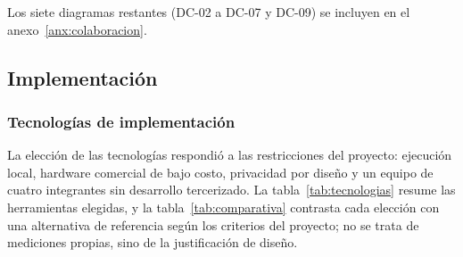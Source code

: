 

Los siete diagramas restantes (DC-02 a DC-07 y DC-09) se incluyen en el anexo~\ref{anx:colaboracion}.

\subsection{Implementación}

\subsubsection{Tecnologías de implementación}\label{sec:tecnologias}

La elección de las tecnologías respondió a las restricciones del proyecto: ejecución local, hardware comercial de bajo costo, privacidad por diseño y un equipo de cuatro integrantes sin desarrollo tercerizado. La tabla~\ref{tab:tecnologias} resume las herramientas elegidas, y la tabla~\ref{tab:comparativa} contrasta cada elección con una alternativa de referencia según los criterios del proyecto; no se trata de mediciones propias, sino de la justificación de diseño.

